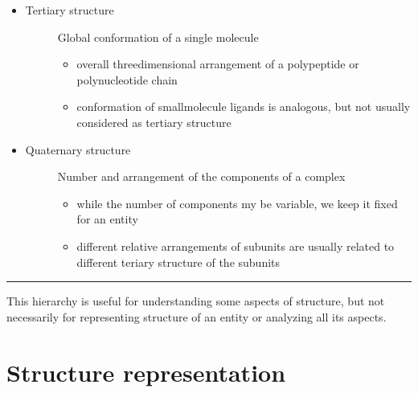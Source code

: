 \documentclass[letterpaper,10pt,english]{sphinxmanual}
\begin{document}
\begin{itemize}
\begin{description}
\begin{itemize}
\end{itemize}

\end{description}

\item {} \begin{description}
\item[{Tertiary structure}] \leavevmode
Global conformation of a single molecule
\begin{itemize}
\item {} 
overall three\sphinxhyphen{}dimensional arrangement of a polypeptide or polynucleotide chain

\item {} 
conformation of small\sphinxhyphen{}molecule ligands is analogous, but not usually considered as tertiary structure

\end{itemize}

\end{description}

\item {} \begin{description}
\item[{Quaternary structure}] \leavevmode
Number and arrangement of the components of a complex
\begin{itemize}
\item {} 
while the number of components my be variable, we keep it fixed for an entity

\item {} 
different relative arrangements of subunits are usually related to different teriary structure of the subunits

\end{itemize}

\end{description}

\end{itemize}


\bigskip\hrule\bigskip


This hierarchy is useful for understanding some aspects of structure, but not necessarily for representing structure of an entity or analyzing all its aspects.


\chapter{Structure representation}
\label{\detokenize{structure_representation:structure-representation}}\label{\detokenize{structure_representation::doc}}
\end{document}

